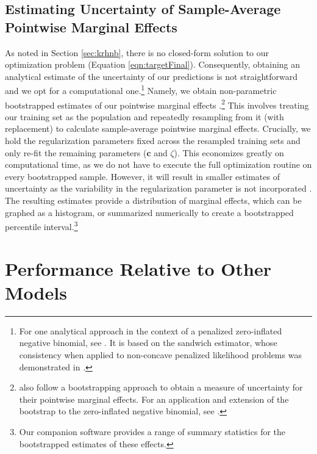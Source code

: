 \documentclass[12pt]{article}
\newcommand{\bc}{\mathbf{c}}
\begin{document}
\subsection{Estimating Uncertainty of Sample-Average Pointwise Marginal Effects}	

As noted in Section \ref{sec:krhnb}, there is no closed-form solution to our optimization problem (Equation \ref{eqn:targetFinal}). Consequently, obtaining an analytical estimate of the uncertainty of our predictions is not straightforward and we opt for a computational one.\footnote{For one analytical approach in the context of a penalized zero-inflated negative binomial, see \cite{Wang2014}. It is based on the sandwich estimator, whose consistency when applied to non-concave penalized likelihood problems was demonstrated in \cite{Fan2001}.} Namely, we obtain non-parametric bootstrapped estimates of our pointwise marginal effects \citep{Efron1979}.\footnote{\cite{Kenkel2013} also follow a bootstrapping approach to obtain a measure of uncertainty for their pointwise marginal effects. For an application and extension of the bootstrap to the zero-inflated negative binomial, see \cite{Garay2011}.} This involves treating our training set as the population and repeatedly resampling from it (with replacement) to calculate sample-average pointwise marginal effects. Crucially, we hold the regularization parameters fixed across the resampled training sets and only re-fit the remaining parameters ($\bc$ and $\zeta$). This economizes greatly on computational time, as we do not have to execute the full optimization routine on every bootstrapped sample. However, it will result in smaller estimates of uncertainty as the variability in the regularization parameter is not incorporated \citep{Tibshirani1996}. The resulting estimates provide a distribution of marginal effects, which can be graphed as a histogram, or summarized numerically to create a bootstrapped percentile interval.\footnote{Our companion software provides a range of summary statistics for the bootstrapped estimates of these effects.}

\section{Performance Relative to Other Models}	\label{sec:comparison}
\end{document}
